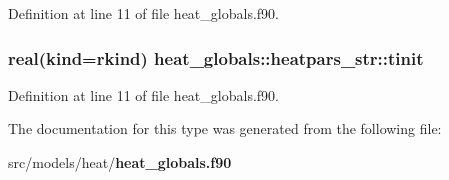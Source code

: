 Definition at line 11 of file heat\+\_\+globals.\+f90.

\subsubsection[{tinit}]{\setlength{\rightskip}{0pt plus 5cm}real(kind=rkind) heat\+\_\+globals\+::heatpars\+\_\+str\+::tinit}\label{structheat__globals_1_1heatpars__str_a24580cdcb9dcd796525505523cdc552b}


Definition at line 11 of file heat\+\_\+globals.\+f90.



The documentation for this type was generated from the following file\+:\begin{DoxyCompactItemize}
\item 
src/models/heat/{\bf heat\+\_\+globals.\+f90}\end{DoxyCompactItemize}
